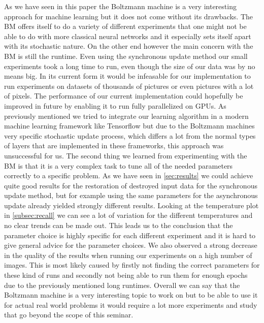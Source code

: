 \documentclass[12pt,twoside]{article}
\theoremstyle{plain}
\theoremstyle{definition}
\theoremstyle{remark}
\begin{document}
As we have seen in this paper the Boltzmann machine is a very interesting approach for machine learning but it does not come without its drawbacks.
The BM offers itself to do a variety of different experiments that one might not be able to do with more classical neural networks and it especially
sets itself apart with its stochastic nature. On the other end however the main concern with the BM is still the runtime.
Even using the synchronous update method our small experiments took a long time to run, even though the size of our data was by no means big.
In its current form it would be infeasable for our implementation to run experiments on datasets of thousands of pictures or even pictures with
a lot of pixels. The performance of our current implementation could hopefully be improved in future by enabling it to run fully
parallelized on GPUs. As previously mentioned we tried to integrate our learning algorithm in a modern machine learning framework 
like Tensorflow but due to the Boltzmann machines very specific stochastic update process, which differs a lot from 
the normal types of layers that are implemented in these frameworks, this approach was unsuccessful for us.\newline
The second thing we learned from experimenting with the BM is that it is a very complex task to tune all of the needed parameters correctly to a
specific problem. As we have seen in \cref{sec:results} we could achieve quite good results for the restoration of destroyed
input data for the synchronous update method, but for example using the same parameters for the asynchronous update already yielded
strongly different results. Looking at the temperature plot in \cref{subsec:recall} we can see a lot of variation for the different temperatures
and no clear trends can be made out. This leads us to the conclusion that the parameter choice is highly specific for each different
experiment and it is hard to give general advice for the parameter choices.\newline
We also observed a strong decrease in the quality of the results when running our experiments on a high number of images.
This is most likely caused by firstly not finding the correct parameters for these kind of runs and secondly 
not being able to run them for enough epochs due to the previously mentioned long runtimes.\newline
Overall we can say that the Boltzmann machine is a very interesting topic to work on but to be able to use
it for actual real world problems it would require a lot more experiments and study that go beyond the scope of this seminar.
\end{document}

